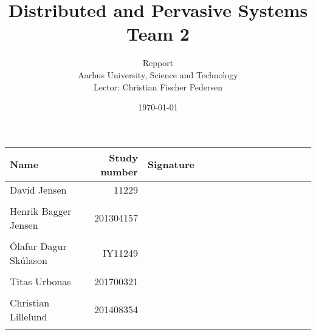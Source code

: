 \documentclass[a4paper,11pt,twoside,openright]{memoir}
\title{Distributed and Pervasive Systems \\ Team 2}
\author{Repport \\ Aarhus University, Science and Technology \\ Lector: Christian Fischer Pedersen}
\date{\today}
\begin{document}
\fancyhf{} %
\frontmatter
\maketitle
\vfill


\begin{table} [h]
	\centering
	\begin{tabular}{|l|r|l|}
	\hline 
	\textbf{Name} 				& \textbf{Study number} & \textbf{Signature~~~~~~~~~~~~~~~~~~~~} 	\\ \hline
	David Jensen 				& 11229 	& \\ && 												\\ \hline
	Henrik Bagger Jensen 		& 201304157 & \\ && 												\\ \hline
	Ólafur Dagur Skúlason 		& IY11249	& \\ && 												\\ \hline
	Titas Urbonas 				& 201700321 & \\ && 												\\ \hline
	Christian Lillelund 		& 201408354 & \\ && 												\\ \hline

	\end{tabular}
\end{table}

\clearpage
\pagestyle{plain}

\tableofcontents

\vfill

\mainmatter
\pagestyle{fancy}
\fancyhf{} %
\fancyhead[CE,CO]{\nouppercase{\leftmark}}
\fancyfoot[CO,CE]{\nouppercase{\rightmark}}
\fancyfoot[LE,RO]{\thepage}

				\cleartorightpage
	\cleartorightpage
		\cleartorightpage
		\cleartorightpage
					\cleartorightpage
				\cleartorightpage
			\cleartorightpage
			\cleartorightpage
				\cleartorightpage
				    \cleartorightpage
				    \cleartorightpage
				\cleartorightpage
					\cleartorightpage

\end{document}
